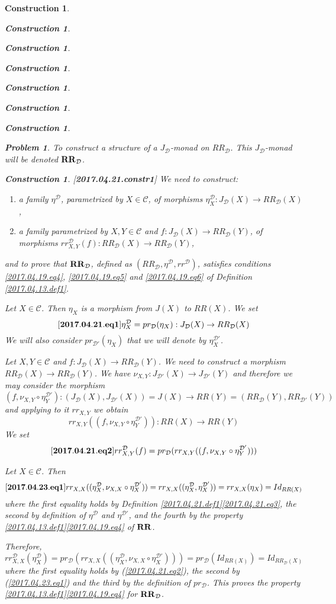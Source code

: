 \documentclass[12pt]{amsart}
\newenvironment{eq}{\begin{equation}}{\end{equation}}
\newtheorem{problem}[proposition]{Problem}
\newtheorem{construction}[proposition]{Construction}
\newcommand{\llabel}[1]{\label{#1}[{\bf #1}]}
\newcommand{\sr}{\rightarrow}
\newcommand{\RR}{{\bf RR}}
\newcommand{\C}{{\mathcal C}}
\newcommand{\D}{{\mathcal D}}
\begin{document}
\begin{construction}
\begin{construction}
\begin{construction}
\begin{construction}
\begin{construction}
\begin{construction}
\begin{construction}
\begin{problem}
To construct a structure of a $J_{\D}$-monad on $RR_{\D}$. This $J_{\D}$-monad will be denoted $\RR_{\D}$.
\end{problem}
%
\begin{construction}\rm
\llabel{2017.04.21.constr1}
We need to construct:
%
\begin{enumerate}
\item a family $\eta^{\D}$, parametrized by $X\in\C$, of morphisms $\eta^{\D}_X:J_{\D}(X)\sr RR_{\D}(X)$,
\item a family parametrized by $X,Y\in\C$ and $f:J_{\D}(X)\sr RR_{\D}(Y)$, of morphisms $rr^{\D}_{X,Y}(f):RR_{\D}(X)\sr RR_{\D}(Y)$,
\end{enumerate}
%
and to prove that $\RR_{\D}$, defined as $(RR_{\D},\eta^{\D},rr^{\D})$,  satisfies 
conditions \ref{2017.04.19.eq4}, \ref{2017.04.19.eq5} and \ref{2017.04.19.eq6} of Definition \ref{2017.04.13.def1}. 

Let $X\in\C$. Then $\eta_X$ is a morphism from $J(X)$ to $RR(X)$. We set 
%
\begin{eq}
\llabel{2017.04.21.eq1}
\eta^{\D}_X=pr_{\D}(\eta_X):J_{\D}(X)\sr RR_{\D}(X)
\end{eq}
%
We will also consider $pr_{\D'}(\eta_X)$ that we will denote by $\eta^{\D'}_X$. 

Let $X,Y\in\C$ and $f:J_{\D}(X)\sr RR_{\D}(Y)$. We need to construct a morphism $RR_{\D}(X)\sr RR_{\D}(Y)$. We have $\nu_{X,Y}:J_{\D'}(X)\sr J_{\D'}(Y)$ and therefore we may consider the morphism 
%
$$(f,\nu_{X,Y}\circ \eta^{\D'}_Y):(J_{\D}(X),J_{\D'}(X))=J(X)\sr RR(Y)=(RR_{\D}(Y),RR_{\D'}(Y))$$
%
and applying to it $rr_{X,Y}$ we obtain 
%
$$rr_{X,Y}((f,\nu_{X,Y}\circ \eta^{\D'}_Y)):RR(X)\sr RR(Y)$$
%
We set
%
\begin{eq}
\llabel{2017.04.21.eq2}
rr^{\D}_{X,Y}(f)=pr_{\D}(rr_{X,Y}((f,\nu_{X,Y}\circ \eta^{\D'}_Y)))
\end{eq}
%

Let $X\in\C$. Then
%
\begin{eq}
\llabel{2017.04.23.eq1}
rr_{X,X}((\eta^{\D}_X,\nu_{X,X}\circ \eta^{\D'}_X))=
rr_{X,X}((\eta^{\D}_X,\eta^{\D'}_X))=
rr_{X,X}(\eta_X)=
Id_{RR(X)}
\end{eq}
%
where the first equality holds by Definition \ref{2017.04.21.def1}\ref{2017.04.21.eq3}, the second by definition of $\eta^{\D}$ and $\eta^{\D'}$, and the fourth by the property \ref{2017.04.13.def1}\ref{2017.04.19.eq4} of $\RR$. 

Therefore,
%
$$rr^{\D}_{X,X}(\eta^{\D}_X)=
pr_{\D}(rr_{X,X}((\eta^{\D}_X,\nu_{X,X}\circ \eta^{\D'}_X)))=
pr_{\D}(Id_{RR(X)})=Id_{RR_{\D}(X)}$$
%
where the first equality holds by (\ref{2017.04.21.eq2}), the second by (\ref{2017.04.23.eq1}) and the third by the definition of $pr_{\D}$. This proves the property \ref{2017.04.13.def1}\ref{2017.04.19.eq4} for $\RR_{\D}$. 


\end{construction}
\end{construction}
\end{construction}
\end{construction}
\end{construction}
\end{construction}
\end{construction}
\end{construction}
\end{document}

